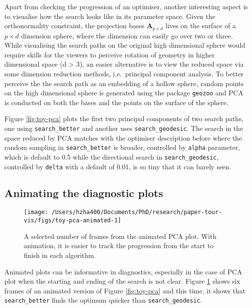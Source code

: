 \documentclass[12pt]{article}
\begin{document}
Apart from checking the progression of an optimiser, another interesting aspect is to visualise how the search looks like in its parameter space. Given the orthonormality constraint, the projection bases \(\mathbf{A}_{p \times d}\) lives on the surface of a \(p \times d\) dimension sphere, where the dimension can easily go over two or three. While visualising the search paths on the original high dimensional sphere would require skills for the viewers to perceive rotation of geometry in higher dimensional space (d \textgreater{} 3), an easier alternative is to view the reduced space via some dimension reduction methods, i.e.~principal component analysis. To better perceive the the search path as an embedding of a hollow sphere, random points on the high dimensional sphere is generated using the package \texttt{geozoo} and PCA is conducted on both the bases and the points on the surface of the sphere.

Figure \ref{fig:toy-pca} plots the first two principal components of two search paths, one using \texttt{search\_better} and another uses \texttt{search\_geodesic}. The search in the space reduced by PCA matches with the optimiser description before where the random sampling in \texttt{search\_better} is broader, controlled by \texttt{alpha} parameter, which is default to 0.5 while the directional search in \texttt{search\_geodesic}, controlled by \texttt{delta} with a default of 0.01, is so tiny that it can barely seen.

\hypertarget{animating-the-diagnostic-plots}{%
\subsection{Animating the diagnostic plots}\label{animating-the-diagnostic-plots}}

\begin{figure}

{\centering \texttt{[image: /Users/hzha400/Documents/PhD/research/paper-tour-vis/figs/toy-pca-animated-1]} 

}

\caption{A selected number of frames from the animated PCA plot. With animation, it is easier to track the progression from the start to finish in each algorithm.}\label{fig:toy-pca-animated}
\end{figure}



Animated plots can be informative in diagnostics, especially in the case of PCA plot when the starting and ending of the search is not clear. Figure \ref{fig:toy-pca-animated} shows six frames of an animated version of Figure \ref{fig:toy-pca} and this time, it shows that \texttt{search\_better} finds the optimum quicker than \texttt{search\_geodesic}.
\end{document}
